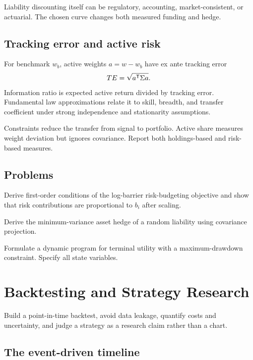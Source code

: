 Liability discounting itself can be regulatory, accounting, market-consistent, or
actuarial. The chosen curve changes both measured funding and hedge.

\section{Tracking error and active risk}

For benchmark $w_b$, active weights $a=w-w_b$ have ex ante tracking error
\[
TE=\sqrt{a^\mathsf T\Sigma a}.
\]
Information ratio is expected active return divided by tracking error. Fundamental
law approximations relate it to skill, breadth, and transfer coefficient under strong
independence and stationarity assumptions.

Constraints reduce the transfer from signal to portfolio. Active share measures
weight deviation but ignores covariance. Report both holdings-based and risk-based
measures.

\section{Problems}

\begin{exercise}
Derive first-order conditions of the log-barrier risk-budgeting objective and show
that risk contributions are proportional to $b_i$ after scaling.
\end{exercise}
\begin{exercise}
Derive the minimum-variance asset hedge of a random liability using covariance
projection.
\end{exercise}
\begin{exercise}
Formulate a dynamic program for terminal utility with a maximum-drawdown constraint.
Specify all state variables.
\end{exercise}


\chapter{Backtesting and Strategy Research}

\begin{objectives}
Build a point-in-time backtest, avoid data leakage, quantify costs and uncertainty,
and judge a strategy as a research claim rather than a chart.
\end{objectives}

\section{The event-driven timeline}


